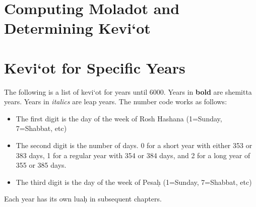 \chapter{Computing Moladot and Determining Kevi`ot}

\chapter{Kevi`ot for Specific Years}

The following is a list of kevi`ot for years until 6000. Years in \textbf{bold} are shemitta years.  Years in \textit{italics} are leap years.  The number code works as follows:
\begin{itemize}
	\item The first digit is the day of the week of Rosh Hashana (1=Sunday, 7=Shabbat, etc)
	\item The second digit is the number of days. 0 for a short year with either 353 or 383 days, 1 for a regular year with 354 or 384 days, and 2 for a long year of 355 or 385 days.
	\item The third digit is the day of the week of Pesa\d{h} (1=Sunday, 7=Shabbat, etc)
\end{itemize}

Each year has its own lua\d{h} in subsequent chapters.\\

